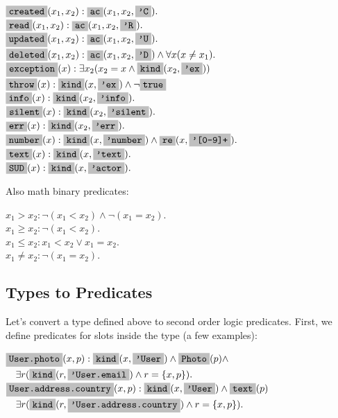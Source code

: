 \documentclass[12pt,oneside,letterpaper]{article}
\begin{document}
        \begin{maths}
        $\type{created}(x_1, x_2): \type{ac}(x_1, x_2, \type{'C}). $ \\
        $\type{read}(x_1, x_2): \type{ac}(x_1, x_2, \type{'R}). $ \\
        $\type{updated}(x_1, x_2): \type{ac}(x_1, x_2, \type{'U}). $ \\
        $\type{deleted}(x_1, x_2): \type{ac}(x_1, x_2, \type{'D}) \wedge \forall x (x \neq x_1). $ \\
        $\type{exception}(x): \exists x_2 (x_2 = x \wedge \type{kind}(x_2, \type{'ex}))$ \\
        $\type{throw}(x): \type{kind}(x, \type{'ex}) \wedge \neg \type{true}$ \\
        $\type{info}(x): \type{kind}(x_2, \type{'info}). $ \\
        $\type{silent}(x): \type{kind}(x_2, \type{'silent}). $ \\
        $\type{err}(x): \type{kind}(x_2, \type{'err}). $ \\
        $\type{number}(x): \type{kind}(x, \type{'number}) \wedge \type{re}(x, \type{'[0-9]+}).$ \\
        $\type{text}(x): \type{kind}(x, \type{'text}).$ \\
        $\type{SUD}(x): \type{kind}(x, \type{'actor}).$ \\
        \end{maths}

        Also math binary predicates:

        \begin{maths}
        $x_1 > x_2: \neg(x_1 < x_2) \wedge \neg(x_1 = x_2). $ \\
        $x_1 \geq x_2: \neg (x_1 < x_2). $ \\
        $x_1 \leq x_2: x_1 < x_2 \vee x_1 = x_2. $ \\
        $x_1 \neq x_2: \neg (x_1 = x_2). $ \\
        \end{maths}

    \subsection{Types to Predicates}

        Let's convert a type defined above to second order logic predicates.
        First, we define predicates for slots inside the type (a few examples):

        \begin{maths}
        $\type{User.photo}(x, p): \type{kind}(x, \type{'User}) \wedge \type{Photo}(p) \wedge$ \\
        $\quad \exists r (\type{kind}(r, \type{'User.email}) \wedge r = \{x, p\}). $ \\
        $\type{User.address.country}(x, p): \type{kind}(x, \type{'User}) \wedge \type{text}(p)$ \\
        $\quad \exists r (\type{kind}(r, \type{'User.address.country}) \wedge r = \{x, p\}). $ \\
        \end{maths}
\end{document}
